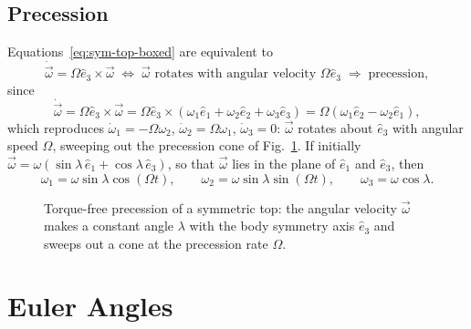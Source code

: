 \documentclass[11pt]{article}
\newcommand{\Om}{\Omega}
\begin{document}
\subsection{Precession}

Equations~\eqref{eq:sym-top-boxed} are equivalent to
\begin{equation}
\dot{\vec\omega} = \Om\hat e_3\times\vec\omega \;\iff\; \vec\omega \text{ rotates with angular velocity } \Om\hat e_3 \;\Rightarrow\; \text{precession},
\label{eq:omega-precesses}
\end{equation}
since
\begin{equation}
\dot{\vec\omega} = \Om\hat e_3\times\vec\omega = \Om\hat e_3\times(\omega_1\hat e_1+\omega_2\hat e_2+\omega_3\hat e_3) = \Om(\omega_1\hat e_2-\omega_2\hat e_1),
\label{eq:omega-precesses-expand}
\end{equation}
which reproduces $\dot\omega_1=-\Om\omega_2$, $\dot\omega_2=\Om\omega_1$, $\dot\omega_3=0$: $\vec\omega$ rotates about $\hat e_3$ with angular speed $\Om$, sweeping out the precession cone of Fig.~\ref{fig:precession-cone}. If initially $\vec\omega=\omega(\sin\lambda\,\hat e_1+\cos\lambda\,\hat e_3)$, so that $\vec\omega$ lies in the plane of $\hat e_1$ and $\hat e_3$, then
\begin{equation}
\boxed{\omega_1=\omega\sin\lambda\cos(\Om t),} \qquad \boxed{\omega_2=\omega\sin\lambda\sin(\Om t),} \qquad \boxed{\omega_3=\omega\cos\lambda.}
\label{eq:precession-solution}
\end{equation}

\begin{figure}[htb]
\centering
{}
\caption{Torque-free precession of a symmetric top: the angular velocity $\vec\omega$ makes a constant angle $\lambda$ with the body symmetry axis $\hat e_3$ and sweeps out a cone at the precession rate $\Om$.}
\label{fig:precession-cone}
\end{figure}

\section{Euler Angles}
\end{document}
